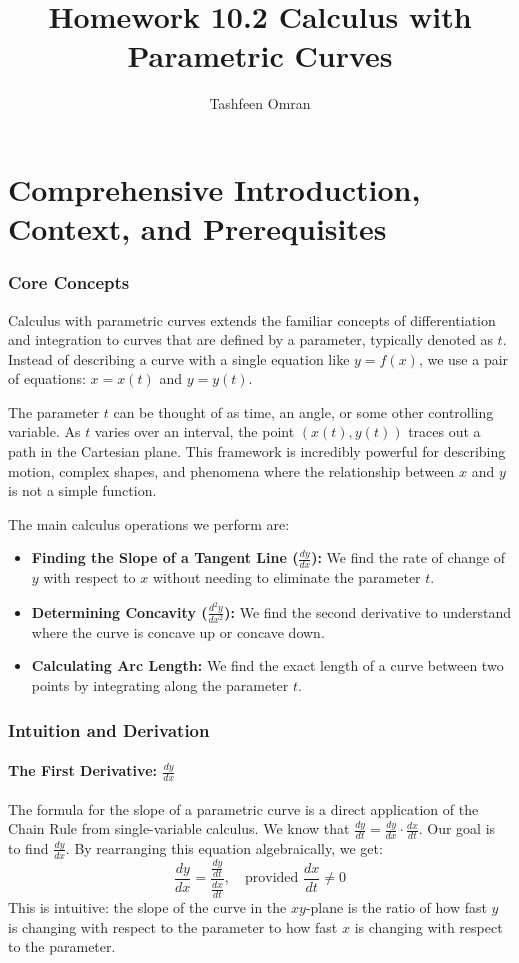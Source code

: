 \documentclass{article}
\title{Homework 10.2 Calculus with Parametric Curves}
\author{Tashfeen Omran}
\date{\October 2025}
\begin{document}
\maketitle

\part{Comprehensive Introduction, Context, and Prerequisites}

\section{Core Concepts}
Calculus with parametric curves extends the familiar concepts of differentiation and integration to curves that are defined by a parameter, typically denoted as $t$. Instead of describing a curve with a single equation like $y = f(x)$, we use a pair of equations: $x = x(t)$ and $y = y(t)$.

The parameter $t$ can be thought of as time, an angle, or some other controlling variable. As $t$ varies over an interval, the point $(x(t), y(t))$ traces out a path in the Cartesian plane. This framework is incredibly powerful for describing motion, complex shapes, and phenomena where the relationship between $x$ and $y$ is not a simple function.

The main calculus operations we perform are:
\begin{itemize}
    \item \textbf{Finding the Slope of a Tangent Line ($\frac{dy}{dx}$):} We find the rate of change of $y$ with respect to $x$ without needing to eliminate the parameter $t$.
    \item \textbf{Determining Concavity ($\frac{d^2y}{dx^2}$):} We find the second derivative to understand where the curve is concave up or concave down.
    \item \textbf{Calculating Arc Length:} We find the exact length of a curve between two points by integrating along the parameter $t$.
\end{itemize}

\section{Intuition and Derivation}

\subsection{The First Derivative: $\frac{dy}{dx}$}
The formula for the slope of a parametric curve is a direct application of the Chain Rule from single-variable calculus. We know that $\frac{dy}{dt} = \frac{dy}{dx} \cdot \frac{dx}{dt}$. Our goal is to find $\frac{dy}{dx}$. By rearranging this equation algebraically, we get:
\[ \frac{dy}{dx} = \frac{\frac{dy}{dt}}{\frac{dx}{dt}}, \quad \text{provided } \frac{dx}{dt} \neq 0 \]
This is intuitive: the slope of the curve in the $xy$-plane is the ratio of how fast $y$ is changing with respect to the parameter to how fast $x$ is changing with respect to the parameter.
\end{document}
